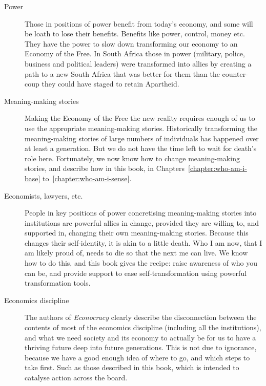 \begin{description}
\item[Power] Those in positions of power benefit from today's economy, and some will be loath to lose their benefits. Benefits like power, control, money etc. They have the power to slow down transforming our economy to an Economy of the Free. In South Africa those in power (military, police, business and political leaders) were transformed into allies by creating a path to a new South Africa that was better for them than the counter-coup they could have staged to retain Apartheid.


\item[Meaning\hyp{}making stories] Making the Economy of the Free the new reality requires enough of us to use the appropriate meaning\hyp{}making stories. Historically transforming the meaning\hyp{}making stories of large numbers of individuals has happened over at least a generation. But we do not have the time left to wait for death's role here. Fortunately, we now know how to change meaning\hyp{}making stories, and describe how in this book, in Chapters~\ref{chapter:who-am-i-base} to~\ref{chapter:who-am-i-sense}. 


\item[Economists, lawyers, etc.] People in key positions of power  concretising meaning\hyp{}making stories into institutions are powerful allies in change, provided they are willing to, and supported in, changing their own meaning\hyp{}making stories. Because this changes their self-identity, it is akin to a little death. Who I am now, that I am likely proud of, needs to die so that the next me can live. We know how to do this, and this book gives the recipe: raise awareness of who you can be, and provide support to ease self-transformation using powerful transformation tools.


\item[Economics discipline] The authors of \emph{Econocracy} clearly describe the disconnection between the contents of most of the economics discipline (including all the institutions), and what we need society and its economy to actually be for us to have a thriving future deep into future generations. This is not due to ignorance, because we have a good enough idea of where to go, and which steps to take first. Such as those described in this book, which is intended to catalyse action across the board.



\end{description}

